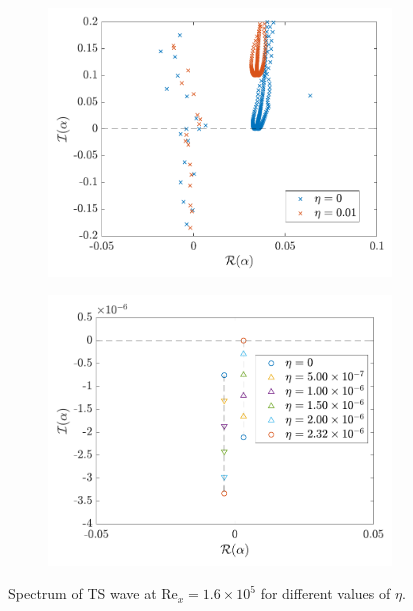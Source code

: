 \begin{figure}
    \centering
    \begin{subfigure}[b]{0.48\textwidth}
        \centering
        \includegraphics[width=1\linewidth]{figures/Bertolotti_Briggs.pdf}
        \caption{}\label{fig:Bertolotti_Briggs_main}
        \end{subfigure}
    \begin{subfigure}[b]{0.48\textwidth}
        \centering
        \includegraphics[width=1\linewidth]{figures/Bertolotti_Briggs_1.pdf}
        \caption{}
        \label{fig:Bertolotti_Briggs_zoom}
    \end{subfigure}
    \caption{Spectrum of TS wave at $\mathrm{Re}_x=1.6\times10^5$ for different values of $\eta$.}
    \label{fig:Bertolotti_Briggs}
\end{figure}


